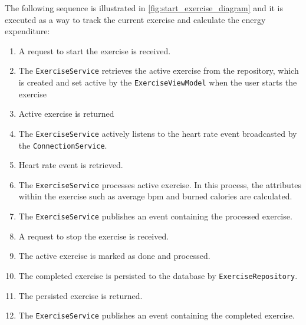 The following sequence is illustrated in \autoref{fig:start_exercise_diagram} and it is executed as a way to track the current exercise and calculate the energy expenditure:
\begin{enumerate}
    \item A request to start the exercise is received.
    \item The \texttt{ExerciseService} retrieves the active exercise from the repository, which is created and set active by the \texttt{ExerciseViewModel} when the user starts the exercise
    \item Active exercise is returned
    \item The \texttt{ExerciseService} actively listens to the heart rate event broadcasted by the \texttt{ConnectionService}.
    \item Heart rate event is retrieved.
    \item The \texttt{ExerciseService} processes active exercise. In this process, the attributes within the exercise such as average bpm and burned calories are calculated.
    \item The \texttt{ExerciseService} publishes an event containing the processed exercise.
    \item A request to stop the exercise is received.
    \item The active exercise is marked as done and processed.
    \item The completed exercise is persisted to the database by \texttt{ExerciseRepository}.
    \item The persisted exercise is returned.
    \item The \texttt{ExerciseService} publishes an event containing the completed exercise.
\end{enumerate}

